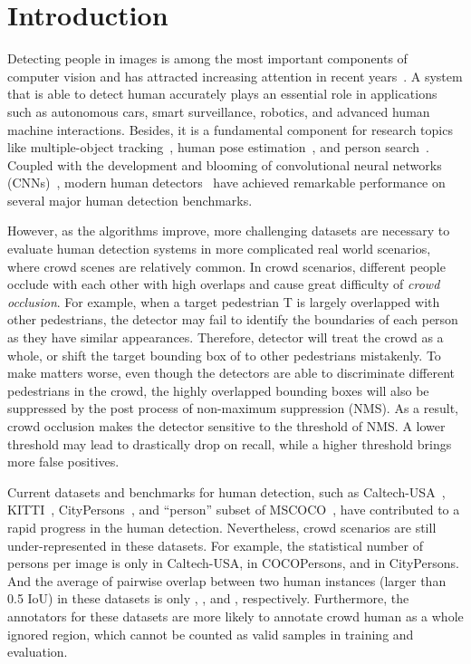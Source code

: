 \documentclass[10pt,twocolumn,letterpaper]{article}
\begin{document}
\section{Introduction}
Detecting people in images is among the most important components of computer vision and has attracted increasing attention in recent years~\cite{zhang2016faster,li2015scale,zhang2015filtered,zhang2016far,hosang2015taking,dollar2009integral,dollar2014fast,dollar2009pedestrian,mao2017can}. 
A system that is able to detect human accurately plays an essential role in applications such as autonomous cars, smart surveillance, robotics, and advanced human machine interactions. Besides, it is a fundamental component for research topics like multiple-object tracking~\cite{mot2015}, human pose estimation~\cite{yilun2018cpn}, and person search~\cite{xiaotong2017cvpr}. Coupled with the development and blooming of convolutional neural networks (CNNs)~\cite{krizhevsky2012imagenet,simonyan2014very,he2016deep}, modern human detectors~\cite{cai2016unified,zhang2016faster,wang2018Repulsion} have achieved remarkable performance on several major human detection benchmarks. 

However, as the algorithms improve, more challenging datasets are necessary to evaluate human detection systems in more complicated real world scenarios, where crowd scenes are relatively common. In crowd scenarios, different people occlude with each other with high overlaps and cause great difficulty of \emph{crowd occlusion}. For example, when a target pedestrian T is largely overlapped with other pedestrians,  the detector may fail to identify the boundaries of each person as they have similar appearances. Therefore,  detector will treat the crowd as a whole, or shift the target bounding box of  to other pedestrians mistakenly. To make matters worse, even though the detectors are able to discriminate different pedestrians in the crowd, the highly overlapped bounding boxes will also be suppressed by the post process of non-maximum suppression (NMS). As a result,  crowd occlusion makes the detector sensitive to the threshold of NMS. A lower threshold may lead to drastically drop on recall, while a higher threshold brings more false positives.




Current datasets and benchmarks for human detection, such as Caltech-USA~\cite{dollar2009pedestrian}, KITTI~\cite{Geiger2012CVPR}, CityPersons~\cite{zhang2017citypersons}, and ``person'' subset of MSCOCO~\cite{lin2014microsoft}, have contributed to a rapid progress in the human detection. Nevertheless, crowd scenarios are still under-represented in these datasets. For example, the statistical number of persons per image is only  in Caltech-USA,  in COCOPersons, and  in CityPersons.  And the average of pairwise overlap between two human instances (larger than 0.5 IoU) in these datasets is only , , and , respectively. Furthermore, the annotators for these datasets are more likely to annotate crowd human as a whole ignored region, which cannot be counted as valid samples in training and evaluation.
\end{document}
